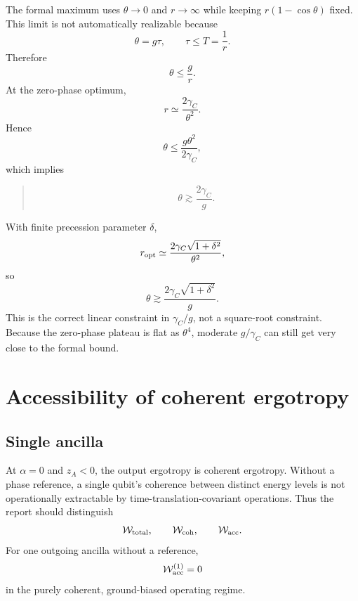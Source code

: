 \documentclass[11pt,a4paper]{article}
\newcommand{\W}{\mathcal{W}}
\newenvironment{resultbox}{\begin{quote}\small}{\end{quote}}
\begin{document}
The formal maximum uses $\theta\to0$ and $r\to\infty$ while keeping $r(1-\cos\theta)$ fixed. This limit is not automatically realizable because
\begin{equation}
\theta=g\tau,
\qquad
\tau\le T=\frac1r.
\end{equation}
Therefore
\begin{equation}
\theta\le\frac{g}{r}.
\end{equation}
At the zero-phase optimum,
\begin{equation}
r\simeq\frac{2\gamma_C}{\theta^2}.
\end{equation}
Hence
\begin{equation}
\theta\le \frac{g\theta^2}{2\gamma_C},
\end{equation}
which implies
\begin{resultbox}
\begin{equation}
\theta\gtrsim\frac{2\gamma_C}{g}.
\end{equation}
\end{resultbox}
With finite precession parameter $\delta$,
\begin{equation}
r_{\rm opt}\simeq\frac{2\gamma_C\sqrt{1+\delta^2}}{\theta^2},
\end{equation}
so
\begin{equation}
\theta\gtrsim\frac{2\gamma_C\sqrt{1+\delta^2}}{g}.
\end{equation}
This is the correct linear constraint in $\gamma_C/g$, not a square-root constraint. Because the zero-phase plateau is flat as $\theta^4$, moderate $g/\gamma_C$ can still get very close to the formal bound.

\section{Accessibility of coherent ergotropy}

\subsection{Single ancilla}

At $\alpha=0$ and $z_A<0$, the output ergotropy is coherent ergotropy. Without a phase reference, a single qubit's coherence between distinct energy levels is not operationally extractable by time-translation-covariant operations. Thus the report should distinguish
\begin{equation}
\W_{\rm total},\qquad \W_{\rm coh},\qquad \W_{\rm acc}.
\end{equation}
For one outgoing ancilla without a reference,
\begin{equation}
\W_{\rm acc}^{(1)}=0
\end{equation}
in the purely coherent, ground-biased operating regime.
\end{document}
